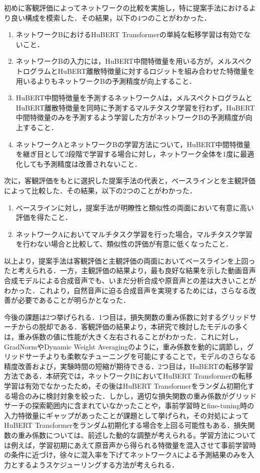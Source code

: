 \documentclass[12pt]{jarticle}
\numberwithin{equation}{section}    %
\numberwithin{figure}{section}      %
\numberwithin{table}{section}      %
\begin{document}
初めに客観評価によってネットワークの比較を実施し，特に提案手法におけるより良い構成を模索した．その結果，以下の4つのことがわかった．
\begin{enumerate}
    \item ネットワークBにおけるHuBERT Transformerの単純な転移学習は有効でないこと．
    \item ネットワークBの入力には，HuBERT中間特徴量を用いる方が，メルスペクトログラムとHuBERT離散特徴量に対するロジットを組み合わせた特徴量を用いるよりもネットワークBの予測精度が向上すること．
    \item HuBERT中間特徴量を予測するネットワークAは，メルスペクトログラムとHuBERT離散特徴量を同時に予測するマルチタスク学習を行わず，HuBERT中間特徴量のみを予測するよう学習した方がネットワークBの予測精度が向上すること．
    \item ネットワークAとネットワークBの学習方法について，HuBERT中間特徴量を継ぎ目として2段階で学習する場合に対し，ネットワーク全体を1度に最適化しても予測精度は改善されないこと．
\end{enumerate}
次に，客観評価をもとに選択した提案手法の代表と，ベースラインとを主観評価によって比較した．その結果，以下の2つのことがわかった．
\begin{enumerate}
    \item ベースラインに対し，提案手法が明瞭性と類似性の両面において有意に高い評価を得たこと．
    \item ネットワークAにおいてマルチタスク学習を行った場合，マルチタスク学習を行わない場合と比較して、類似性の評価が有意に低くなったこと．
\end{enumerate}

以上より，提案手法は客観評価と主観評価の両面においてベースラインを上回ったと考えられる．一方，主観評価の結果より，最も良好な結果を示した動画音声合成モデルによる合成音声でも、いまだ分析合成や原音声との差は大きいことがわかった．これより，自然音声に迫る合成音声を実現するためには，さらなる改善が必要であることが明らかとなった．

今後の課題は2つ挙げられる．1つ目は，損失関数の重み係数に対するグリッドサーチからの脱却である．客観評価の結果より，本研究で検討したモデルの多くは，重み係数の値に性能が大きく左右されることがわかった．これに対し，GradNormやDynamic Weight Averagingのように，重み係数を動的に調節し，グリッドサーチよりも柔軟なチューニングを可能にすることで，モデルのさらなる精度改善および，実験時間の短縮が期待できる．2つ目は，HuBERTの転移学習方法である．本研究では，ネットワークBにおいてHuBERT Transformerの転移学習は有効でなかったため，その後はHuBERT Transformerをランダム初期化する場合のみに検討対象を絞った．しかし，適切な損失関数の重み係数がグリッドサーチの探索範囲内に含まれていなかったことや，事前学習時とfine-tuning時の入力特徴量にギャップがあったことが課題として挙げられ，その対処によってHuBERT Transformerをランダム初期化する場合を上回る可能性もある．損失関数の重み係数については、前述した動的な調整が考えられる。学習方法については例えば，学習初期にあえて原音声から得られる特徴量を混入させて事前学習時の条件に近づけ，徐々に混入率を下げてネットワークAによる予測結果のみを入力とするようスケジューリングする方法が考えられる．
\end{document}
